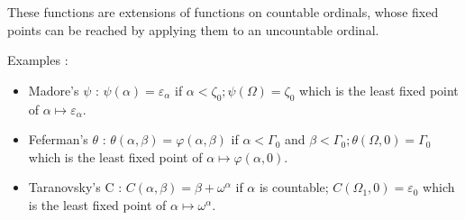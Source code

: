 \documentclass[8pt]{article}
\begin{document}
These functions are extensions of functions on countable ordinals, whose fixed points can be reached by applying them to an uncountable ordinal.

Examples :
\vspace{-0.4cm}
\smallskip
\begin{itemize}
     \setlength{\itemsep}{1pt}
     \setlength{\parskip}{0pt}
     \setlength{\parsep}{0pt}
\item Madore's \(\psi\) : \(\psi(\alpha) = \varepsilon_\alpha \) if \(\alpha < \zeta_0 ; \psi(\Omega) = \zeta_0 \) which is the least fixed point of \( \alpha \mapsto \varepsilon_\alpha \).
\vspace{-0.1cm}
\item Feferman's \(\theta\) : \(\theta(\alpha,\beta) = \varphi(\alpha,\beta) \) if \( \alpha < \Gamma_0 \) and \( \beta < \Gamma_0 ; \theta(\Omega,0) = \Gamma_0 \) which is the least fixed point of \( \alpha \mapsto \varphi(\alpha,0) \).
\vspace{-0.1cm}
\item Taranovsky's C : \( C(\alpha,\beta) = \beta+\omega^\alpha \) if \( \alpha \) is countable; \( C(\Omega_1,0) = \varepsilon_0 \) which is the least fixed point of \( \alpha \mapsto \omega^\alpha \).
\end{itemize}

\vspace{0.1cm}
\end{document}
